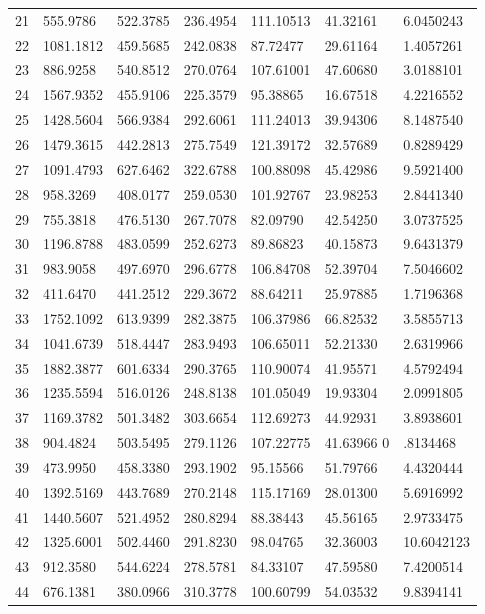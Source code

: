 \documentclass[a4paper]{article}
\begin{document}
\begin{appendices}
\begin{figure}[H]
\begin{tabular}{lllllll}
21  &555.9786 &522.3785 &236.4954 &111.10513 &41.32161  &6.0450243\\
22 &1081.1812 &459.5685 &242.0838  &87.72477 &29.61164  &1.4057261\\
23 & 886.9258 &540.8512 &270.0764 &107.61001 &47.60680  &3.0188101\\
24 &1567.9352 &455.9106 &225.3579  &95.38865 &16.67518  &4.2216552\\
25 &1428.5604 &566.9384 &292.6061 &111.24013 &39.94306 & 8.1487540\\
26 &1479.3615 &442.2813 &275.7549 &121.39172 &32.57689  &0.8289429\\
27 &1091.4793 &627.6462 &322.6788 &100.88098 &45.42986  &9.5921400\\
28  &958.3269 &408.0177 &259.0530 &101.92767 &23.98253  &2.8441340\\
29  &755.3818 &476.5130 &267.7078  &82.09790 &42.54250  &3.0737525\\
30 &1196.8788 &483.0599 &252.6273 & 89.86823 &40.15873  &9.6431379\\
31  &983.9058 &497.6970 &296.6778 &106.84708 &52.39704  &7.5046602\\
32  &411.6470 &441.2512 &229.3672 & 88.64211 &25.97885  &1.7196368\\
33 &1752.1092 &613.9399 &282.3875 &106.37986 &66.82532  &3.5855713\\
34 &1041.6739 &518.4447 &283.9493 &106.65011 &52.21330  &2.6319966\\
35 &1882.3877 &601.6334 &290.3765 &110.90074 &41.95571  &4.5792494\\
36 &1235.5594 &516.0126 &248.8138 &101.05049 &19.93304  &2.0991805\\
37 &1169.3782 &501.3482 &303.6654 &112.69273 &44.92931  &3.8938601\\
38  &904.4824 &503.5495 &279.1126 &107.22775 &41.63966  0&.8134468\\
39  &473.9950 &458.3380 &293.1902  &95.15566 &51.79766  &4.4320444\\
40 &1392.5169 &443.7689 &270.2148 &115.17169 &28.01300  &5.6916992\\
41 &1440.5607 &521.4952 &280.8294  &88.38443 &45.56165  &2.9733475\\
42 &1325.6001 &502.4460 &291.8230  &98.04765 &32.36003 &10.6042123\\
43  &912.3580 &544.6224 &278.5781  &84.33107 &47.59580  &7.4200514\\
44  &676.1381 &380.0966 &310.3778 &100.60799 &54.03532  &9.8394141\\

\end{tabular}
\end{figure}
\end{appendices}
\end{document}
